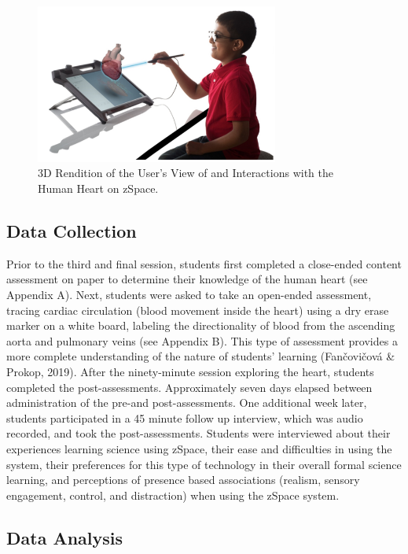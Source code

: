 \documentclass[11.5pt]{sig-alternate} %
\begin{document}
\begin{large}
\begin{figure}[h]
    \centering
    \includegraphics[width=8cm]{Figure 3.png}
    \caption{3D Rendition of the User’s View of and Interactions with the Human Heart on zSpace.}
\end{figure}

\subsection*{Data Collection}

Prior to the third and final session, students first completed a close-ended content assessment on paper to determine their knowledge of the human heart (see Appendix A). Next, students were asked to take an open-ended assessment, tracing cardiac circulation (blood movement inside the heart) using a dry erase marker on a white board, labeling the directionality of blood from the ascending aorta and pulmonary veins (see Appendix B). This type of assessment provides a more complete understanding of the nature of students’ learning (Fančovičová \& Prokop, 2019). After the ninety-minute session exploring the heart, students completed the post-assessments. Approximately seven days elapsed between administration of the pre-and post-assessments. One additional week later, students participated in a 45 minute follow up interview, which was audio recorded, and took the post-assessments. Students were interviewed about their experiences learning science using zSpace, their ease and difficulties in using the system, their preferences for this type of technology in their overall formal science learning, and perceptions of presence based associations (realism, sensory engagement, control, and distraction) when using the zSpace system.  

\subsection*{Data Analysis}


\end{large}
\end{document}
